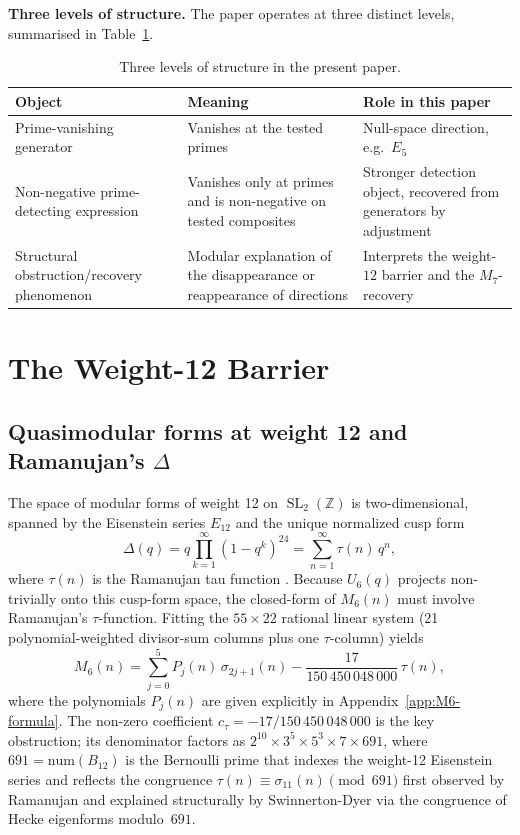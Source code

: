 \documentclass[11pt]{article}
\newcommand{\SL}{\operatorname{SL}}
\begin{document}
\textbf{Three levels of structure.}
The paper operates at three distinct levels, summarised in Table~\ref{tab:three-levels}.

\begin{table}[htbp]
\centering
\caption{Three levels of structure in the present paper.}
\label{tab:three-levels}
\begin{tabular}{@{}p{4.2cm}p{4.5cm}p{5.5cm}@{}}
\toprule
Object & Meaning & Role in this paper \\
\midrule
Prime-vanishing generator
  & Vanishes at the tested primes
  & Null-space direction, e.g.\ $E_5$ \\[4pt]
Non-negative prime-detecting expression
  & Vanishes only at primes and is non-negative on tested composites
  & Stronger detection object, recovered from generators by adjustment \\[4pt]
Structural obstruction/recovery phenomenon
  & Modular explanation of the disappearance or reappearance of directions
  & Interprets the weight-$12$ barrier and the $M_7$-recovery \\
\bottomrule
\end{tabular}
\end{table}

\section{The Weight-12 Barrier}
\label{sec:barrier}

\subsection{Quasimodular forms at weight 12 and Ramanujan's $\Delta$}

The space of modular forms of weight 12 on $\SL_2(\mathbb{Z})$ is two-dimensional, spanned
by the Eisenstein series $E_{12}$ and the unique normalized cusp form
\[
\Delta(q)=q\prod_{k=1}^{\infty}(1-q^k)^{24}=\sum_{n=1}^{\infty}\tau(n)\,q^n,
\]
where $\tau(n)$ is the Ramanujan tau function \cite{Ramanujan1916}.
Because $U_6(q)$ projects non-trivially onto this cusp-form space, the closed-form of
$M_6(n)$ must involve Ramanujan's $\tau$-function.
Fitting the $55\times 22$ rational linear system (21 polynomial-weighted divisor-sum
columns plus one $\tau$-column) yields
\begin{equation}
\label{eq:M6-formula}
M_6(n)=\sum_{j=0}^{5}P_j(n)\,\sigma_{2j+1}(n)-\frac{17}{150\,450\,048\,000}\,\tau(n),
\end{equation}
where the polynomials $P_j(n)$ are given explicitly in Appendix~\ref{app:M6-formula}.
The non-zero coefficient $c_\tau=-17/150\,450\,048\,000$ is the key obstruction;
its denominator factors as $2^{10}\times 3^5\times 5^3\times 7\times 691$, where
$691=\mathrm{num}(B_{12})$ is the Bernoulli prime that indexes the weight-12 Eisenstein
series and reflects the congruence $\tau(n)\equiv\sigma_{11}(n)\pmod{691}$
first observed by Ramanujan \cite{Ramanujan1916} and explained structurally by
Swinnerton-Dyer \cite{SwinnDyer1973} via the congruence of Hecke eigenforms modulo~$691$.
\end{document}
